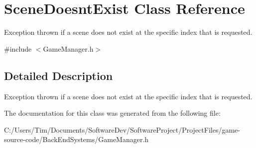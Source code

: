 \hypertarget{class_scene_doesnt_exist}{}\section{Scene\+Doesnt\+Exist Class Reference}
\label{class_scene_doesnt_exist}


Exception thrown if a scene does not exist at the specific index that is requested.  




{\ttfamily \#include $<$Game\+Manager.\+h$>$}



\subsection{Detailed Description}
Exception thrown if a scene does not exist at the specific index that is requested. 

The documentation for this class was generated from the following file\+:\begin{DoxyCompactItemize}
\item 
C\+:/\+Users/\+Tim/\+Documents/\+Software\+Dev/\+Software\+Project/\+Project\+Files/game-\/source-\/code/\+Back\+End\+Systems/Game\+Manager.\+h\end{DoxyCompactItemize}
